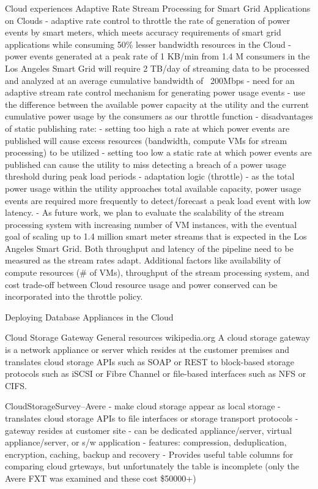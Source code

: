 	Cloud experiences
			Adaptive Rate Stream Processing for Smart Grid Applications on Clouds
				- adaptive rate control to throttle the rate of generation of power events by smart meters, which meets accuracy requirements of smart grid applications while consuming 50\% lesser bandwidth resources in the Cloud
				- power events generated at a peak rate of 1 KB/min from 1.4 M consumers in the Los Angeles Smart Grid will require 2 TB/day of streaming data to be processed and analyzed at an average cumulative bandwidth of ~200Mbps
				- need for an adaptive stream rate control mechanism for generating power usage events
				- use the difference between the available power capacity at the utility and the current cumulative power usage by the consumers as our throttle function
				- disadvantages of static publishing rate:
					- setting too high a rate at which power events are published will cause excess resources (bandwidth, compute VMs for stream processing) to be utilized
					- setting too low a static rate at which power events are published can cause the utility to miss detecting a breach of a power usage threshold during peak load periods
				- adaptation logic (throttle)
					- as the total power usage within the utility approaches total available capacity, power usage events are required more frequently to detect/forecast a peak load event with low latency.
				- As future work, we plan to evaluate the scalability of the stream processing system with increasing number of VM instances, with the eventual goal of scaling up to 1.4 million smart meter streams that is expected in the Los Angeles Smart Grid. Both throughput and latency of the pipeline need to be measured as the stream rates adapt. Additional factors like availability of compute resources (\# of VMs), throughput of the stream processing system, and cost trade-off between Cloud resource usage and power conserved can be incorporated into the throttle policy.		
				
			Deploying Database Appliances in the Cloud
			
	Cloud Storage Gateway
		General resources
			wikipedia.org
				A cloud storage gateway is a network appliance or server which resides at the customer premises and translates cloud storage APIs such as SOAP or REST to block-based storage protocols such as iSCSI or Fibre Channel or file-based interfaces such as NFS or CIFS.
			
			CloudStorageSurvey--Avere
				- make cloud storage appear as local storage
				- translates cloud storage APIs to file interfaces or storage transport protocols
				- gateway resides at customer site
					- can be dedicated appliance/server, virtual appliance/server, or s/w application
						- features: compression, deduplication, encryption, caching, backup and recovery
				- Provides useful table columns for comparing cloud grteways, but unfortunately the table is incomplete (only the Avere FXT was examined and these cost \$50000+)	

